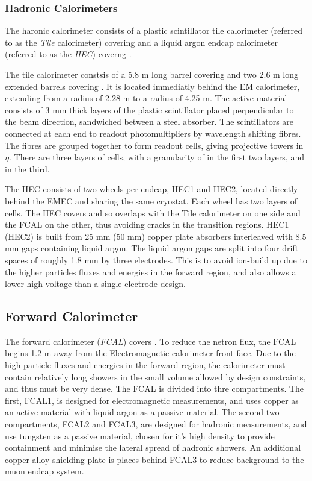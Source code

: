 \subsubsection{Hadronic Calorimeters}

The haronic calorimeter consists of a plastic scintillator tile calorimeter 
(referred to as the {\it Tile} calorimeter) covering  and a liquid
argon endcap calorimeter (referred to as the {\it HEC}) coverng
. 

The tile calorimeter constsis of a 5.8 m long barrel covering
 and two 2.6 m long extended barrels covering
.
It is located immediatly behind the EM calorimeter, extending from a radius of
2.28 m to a radius of 4.25 m. The active material consists of 3 mm thick layers of the plastic scintillator 
placed perpendicular to the beam direction, sandwiched between a steel absorber.
The scintillators are connected at each end to
readout photomultipliers by wavelength shifting fibres. The fibres are grouped
together to form readout cells, giving projective towers in $\eta$. There are
three layers of cells, with a granularity of  in the
first two layers, and  in the third.

The HEC consists of two wheels per endcap, HEC1 and HEC2, located directly
behind the EMEC and sharing the same cryostat. Each wheel has two layers of
cells. The HEC covers  and so overlaps with the Tile
calorimeter on one side and the FCAL on the other, thus avoiding cracks in the
transition regions. HEC1 (HEC2) is built from 25 mm (50 mm) copper plate
absorbers interleaved with 8.5 mm gaps containing liquid argon. The liquid
argon gaps are split into four drift spaces of roughly 1.8 mm by three
electrodes. This is to avoid ion-build up due to the higher particles fluxes
and energies in the forward region, and also allows a lower high voltage than a single
electrode design.

\subsection{Forward Calorimeter}

The forward calorimeter ({\it FCAL}) covers . To reduce the
netron flux, the FCAL begins 1.2 m away from the Electromagnetic calorimeter
front face. Due to the high particle fluxes and energies in the forward region,
the calorimeter must contain relatively long showers in the small volume allowed
by design constraints, and thus must be very dense. The FCAL is divided into
thre compartments. The first, FCAL1, is designed for electromagnetic
measurements, and uses copper as an active material with liquid argon as a
passive material. The second two compartments, FCAL2 and FCAL3, are designed for hadronic
measurements, and use tungsten as a passive material, chosen for it's high
density to provide containment and minimise the lateral spread of hadronic
showers. An additional copper alloy shielding plate is places behind FCAL3 to
reduce background to the muon endcap system.


